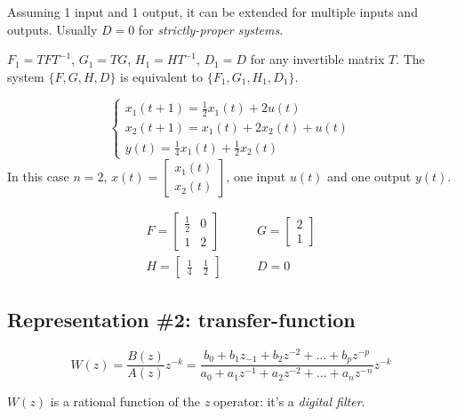 Assuming 1 input and 1 output, it can be extended for multiple inputs and outputs. Usually $D=0$ for \emph{strictly-proper systems}.

\begin{remark}
    $F_1 = TFT^{-1}$, $G_1 = TG$, $H_1 = HT^{-1}$, $D_1 = D$ for any invertible matrix $T$. The system $\{F, G, H, D\}$ is equivalent to $\{F_1, G_1, H_1, D_1\}$.
\end{remark}

\begin{example}
    \[
        \begin{cases}
            x_1(t+1) = \frac{1}{2} x_1(t) + 2u(t) \\
            x_2(t+1) = x_1(t) + 2x_2(t) + u(t) \\
            y(t) = \frac{1}{4}x_1(t) + \frac{1}{2}x_2(t)
        \end{cases}
    \]
    In this case $n=2$, $x(t) = \begin{bmatrix}
        x_1(t) \\
        x_2(t)
    \end{bmatrix}$, one input $u(t)$ and one output $y(t)$.

    \begin{align*}
        F = \begin{bmatrix}
            \frac{1}{2} & 0 \\
            1 & 2
        \end{bmatrix}
        & \qquad
        G = \begin{bmatrix}
            2 \\ 1
        \end{bmatrix}
        \\
        H = \begin{bmatrix}
            \frac{1}{4} & \frac{1}{2}
        \end{bmatrix}
        & \qquad
        D = 0
    \end{align*}
\end{example}

\subsection{Representation \#2: transfer-function}

\[
    W(z) = \frac{B(z)}{A(z)} z^{-k} = \frac{b_0 + b_1z_{-1} + b_2z^{-2} + \ldots + b_pz^{-p}}{a_0 + a_1z^{-1} + a_2z^{-2} + \ldots + a_nz^{-n}} z^{-k}
\]

$W(z)$ is a rational function of the \emph{z} operator: it's a \emph{digital filter}.

